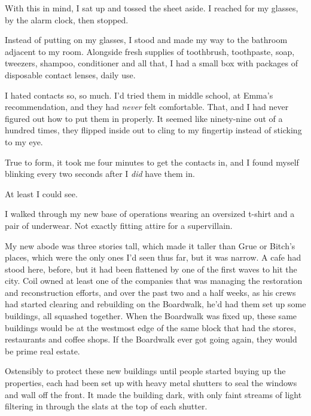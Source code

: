 With this in mind, I sat up and tossed the sheet aside.  I reached for my glasses, by the alarm clock, then stopped.



Instead of putting on my glasses, I stood and made my way to the bathroom adjacent to my room.  Alongside fresh supplies of toothbrush, toothpaste, soap, tweezers, shampoo, conditioner and all that, I had a small box with packages of disposable contact lenses, daily use.



I hated contacts so, so much.  I'd tried them in middle school, at Emma's recommendation, and they had \emph{never} felt comfortable.  That, and I had never figured out how to put them in properly.  It seemed like ninety-nine out of a hundred times, they flipped inside out to cling to my fingertip instead of sticking to my eye.



True to form, it took me four minutes to get the contacts in, and I found myself blinking every two seconds after I \emph{did} have them in.



At least I could see.



I walked through my new base of operations wearing an oversized t-shirt and a pair of underwear.  Not exactly fitting attire for a supervillain.



My new abode was three stories tall, which made it taller than Grue or Bitch's places, which were the only ones I'd seen thus far, but it was narrow.  A cafe had stood here, before, but it had been flattened by one of the first waves to hit the city.  Coil owned at least one of the companies that was managing the restoration and reconstruction efforts, and over the past two and a half weeks, as his crews had started clearing and rebuilding on the Boardwalk, he'd had them set up some buildings, all squashed together.  When the Boardwalk was fixed up, these same buildings would be at the westmost edge of the same block that had the stores, restaurants and coffee shops.  If the Boardwalk ever got going again, they would be prime real estate.



Ostensibly to protect these new buildings until people started buying up the properties, each had been set up with heavy metal shutters to seal the windows and wall off the front.  It made the building dark, with only faint streams of light filtering in through the slats at the top of each shutter.



